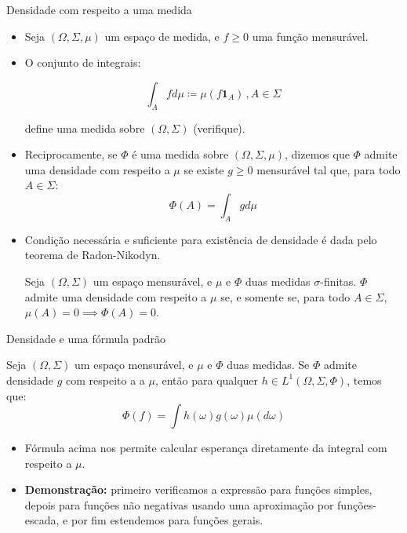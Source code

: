 \documentclass[11pt]{beamer}
\begin{document}
	\begin{frame}{Densidade com respeito a uma medida}

	\begin{itemize}
		\item 	Seja $(\Omega, \Sigma, \mu)$ um espaço de medida, e $f\geq0$ uma função mensurável.
		\item O conjunto de integrais:
		
		$$\int_{A} f d \mu \coloneqq \mu(f \mathbf{1}_{A})\, , A \in \Sigma$$
		
		define uma medida sobre $(\Omega, \Sigma)$ (verifique).
		\item Reciprocamente, se $\Phi$ é uma medida sobre $(\Omega,\Sigma,\mu)$, dizemos que $\Phi$ admite uma densidade com respeito a $\mu$ se existe $g \geq 0$ mensurável tal que, para todo $A \in \Sigma$:
		$$\Phi(A) = \int_{A} g d \mu$$
		\item Condição necessária e suficiente para existência de densidade é dada pelo teorema de Radon-Nikodyn.
		\begin{theorem}
			Seja $(\Omega,\Sigma)$ um espaço mensurável, e $\mu$ e $\Phi$ duas medidas {\color{red}$\sigma$-finitas}. $\Phi$ admite uma densidade com respeito a $\mu$ se, e somente se, para todo $A \in \Sigma$, $\mu(A) = 0 \implies \Phi(A) = 0$.
		\end{theorem}
	\end{itemize}

	\end{frame}
	\begin{frame}{Densidade e uma fórmula padrão}
		\begin{lemma}
			Seja $(\Omega,\Sigma)$ um espaço mensurável, e $\mu$ e $\Phi$ duas medidas.  Se $\Phi$ admite densidade $g$ com respeito a a $\mu$, então para qualquer $h \in L^1(\Omega, \Sigma, \Phi)$, temos que:
			$$\Phi(f) = \int h(\omega) g(\omega) \mu(d\omega)$$
		\end{lemma}
		\begin{itemize}
			\item Fórmula acima nos permite calcular esperança diretamente da integral com respeito a $\mu$.
			\item \textbf{Demonstração:} primeiro verificamos  a expressão para funções simples, depois para funções não negativas usando uma aproximação por funções-escada, e por fim estendemos para funções gerais.
		\end{itemize}
	\end{frame}
\end{document}

